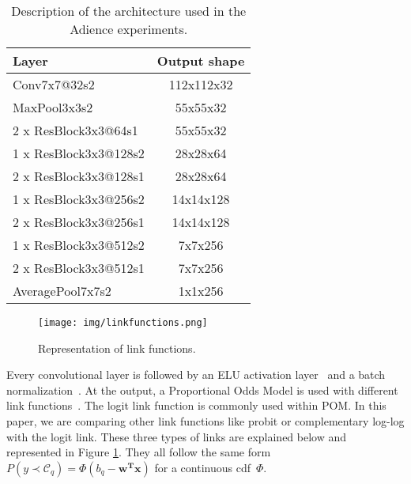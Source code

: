 \documentclass[journal]{IEEEtran}
\begin{document}
	\begin{table}[!t]
		\caption{Description of the architecture used in the Adience experiments.}
		\label{table:ResNetArchitecture}
		\centering
		\begin{tabular}{|l|c|}
			\hline
			\textbf{Layer} & \textbf{Output shape}\\
			\hline
			Conv7x7@32s2 & 112x112x32\\\hline
			MaxPool3x3s2 & 55x55x32\\\hline
			2 x ResBlock3x3@64s1 & 55x55x32\\\hline
			1 x ResBlock3x3@128s2 & 28x28x64\\\hline
			2 x ResBlock3x3@128s1 & 28x28x64\\\hline
			1 x ResBlock3x3@256s2 & 14x14x128\\\hline
			2 x ResBlock3x3@256s1 & 14x14x128\\\hline
			1 x ResBlock3x3@512s2 & 7x7x256\\\hline
			2 x ResBlock3x3@512s1 & 7x7x256\\\hline
			AveragePool7x7s2 & 1x1x256\\
			\hline
		\end{tabular}	
	\end{table}
	
	\begin{figure}[!t]
		\centering
		\texttt{[image: img/linkfunctions.png]}
		\caption{Representation of link functions.}
		\label{fig:linkfunctions}
	\end{figure}
	
	Every convolutional layer is followed by an ELU activation layer~\cite{clevert2015fast} and a batch normalization~\cite{ioffe2015batch}. At the output, a Proportional Odds Model is used with different link functions~\cite{agresti2010analysis}. The logit link function is commonly used within POM. In this paper, we are comparing other link functions like probit or complementary log-log with the logit link. These three types of links are explained below and represented in Figure \ref{fig:linkfunctions}. They all follow the same form $P(y \prec \mathcal{C}_q) = \Phi(b_q-\mathbf{w^Tx})$ for a continuous cdf~$\Phi$.
	
\end{document}
